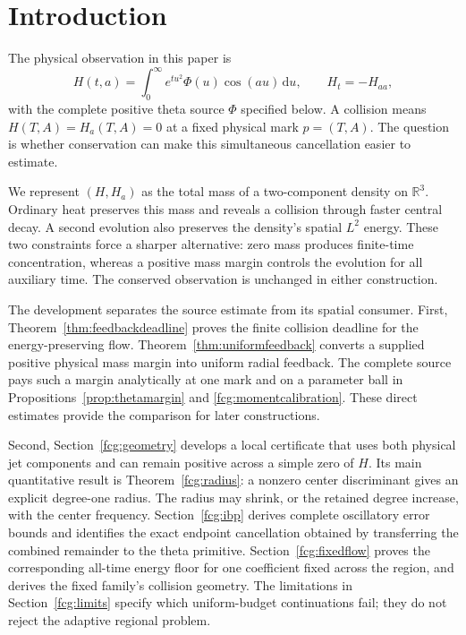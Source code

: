 \documentclass[11pt]{article}
\numberwithin{equation}{section}
\newcommand{\dd}{\,\mathrm d}
\newcommand{\R}{\mathbb R}
\begin{document}
\section{Introduction}

The physical observation in this paper is
\[
 H(t,a)=\int_0^\infty e^{tu^2}\Phi(u)\cos(au)\dd u,
 \qquad H_t=-H_{aa},
\]
with the complete positive theta source $\Phi$ specified below.
A collision means $H(T,A)=H_a(T,A)=0$ at a fixed physical mark
$p=(T,A)$. The question is whether conservation can make this
simultaneous cancellation easier to estimate.

We represent $(H,H_a)$ as the total mass of a two-component density
on $\R^3$. Ordinary heat preserves this mass and reveals a collision
through faster central decay. A second evolution also preserves the
density's spatial $L^2$ energy. These two constraints force a sharper
alternative: zero mass produces finite-time concentration, whereas a
positive mass margin controls the evolution for all auxiliary time.
The conserved observation is unchanged in either construction.

The development separates the source estimate from its spatial
consumer. First, Theorem~\ref{thm:feedbackdeadline} proves the finite
collision deadline for the energy-preserving flow.
Theorem~\ref{thm:uniformfeedback} converts a supplied positive physical
mass margin into uniform radial feedback. The complete source pays
such a margin analytically at one mark and on a parameter ball in
Propositions~\ref{prop:thetamargin} and \ref{fcg:momentcalibration}.
These direct estimates provide the comparison for later constructions.

Second, Section~\ref{fcg:geometry} develops a local certificate that
uses both physical jet components and can remain positive across a
simple zero of $H$. Its main quantitative result is
Theorem~\ref{fcg:radius}: a nonzero center discriminant gives an explicit
degree-one radius. The radius may shrink, or the retained degree
increase, with the center frequency. Section~\ref{fcg:ibp} derives
complete oscillatory error bounds and identifies the exact endpoint
cancellation obtained by transferring the combined remainder to the
theta primitive. Section~\ref{fcg:fixedflow} proves the corresponding
all-time energy floor for one coefficient fixed across the region,
and derives the fixed family's collision geometry. The limitations in
Section~\ref{fcg:limits} specify which uniform-budget continuations fail;
they do not reject the adaptive regional problem.
\end{document}
